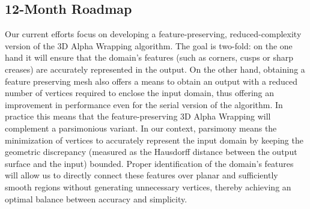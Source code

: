 \subsection{12-Month Roadmap}
\label{sec:WP1:CGAL:roadmap}




Our current efforts focus on developing a feature-preserving, reduced-complexity version of the 3D Alpha Wrapping algorithm.
The goal is two-fold: on the one hand it will ensure that the domain's features (such as corners, cusps or sharp creases) are accurately represented in the output. On the other hand, obtaining a feature preserving mesh also offers a means to obtain an output with a reduced number of vertices required to enclose the input domain, thus offering an improvement in performance even for the serial version of the algorithm. 
In practice this means that the feature-preserving 3D Alpha Wrapping will complement a parsimonious variant.
In our context, parsimony means the minimization of vertices to accurately represent the input domain by keeping 
the geometric discrepancy (measured as the Hausdorff distance between the output surface and the input) bounded.
Proper identification of the domain's features will allow us to directly connect these features over planar and sufficiently 
smooth regions without generating unnecessary vertices, thereby achieving an optimal balance between accuracy and simplicity.


